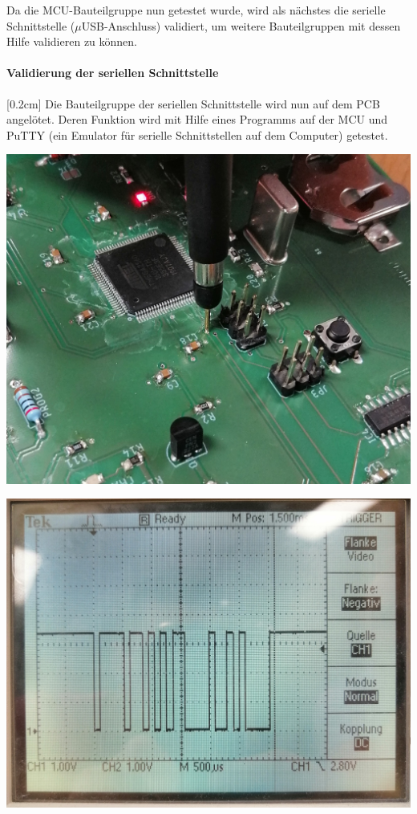 Da die MCU-Bauteilgruppe nun getestet wurde, wird als nächstes die serielle Schnittstelle ($\mu$USB-Anschluss) validiert, um weitere Bauteilgruppen mit dessen Hilfe validieren zu können.

\paragraph{\textbf{Validierung der seriellen Schnittstelle}}[0.2cm]
Die Bauteilgruppe der seriellen Schnittstelle wird nun auf dem PCB angelötet. Deren Funktion wird mit Hilfe eines Programms auf der MCU und PuTTY (ein Emulator für serielle Schnittstellen auf dem Computer) getestet.

{\begin{minipage}[b][7.5cm][t]{0.49\textwidth}
\centering
\includegraphics[width=0.9\linewidth]{graphics/HW_Val/Testpunkt_serial.jpg}
\label{fig:Testpunkt_serial}
\end{minipage}}
{\begin{minipage}[b][7.5cm][t]{0.49\textwidth}
\centering
\includegraphics[width=0.9\linewidth]{graphics/HW_Val/Ergebnis_serial.jpg}
\label{fig:Ergebnis_serial}
\end{minipage}}\\

